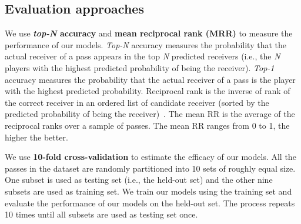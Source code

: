 \subsection{Evaluation approaches}

We use \textbf{\textit{top-N} accuracy} and \textbf{mean reciprocal rank (MRR)} to measure the performance of our models.
\textit{Top-N} accuracy measures the probability that the actual receiver of a pass appears in the top \textit{N} predicted receivers (i.e., the \textit{N} players with the highest predicted probability of being the receiver).
\textit{Top-1} accuracy measures the probability that the actual receiver of a pass is the player with the highest predicted probability.
Reciprocal rank is the inverse of rank of the correct receiver in an ordered list of candidate receiver (sorted by the predicted probability of being the receiver)~\cite{Craswell2009}.
The mean RR is the average of the reciprocal ranks over a sample of passes. The mean RR ranges from 0 to 1, the higher the better.
 
We use \textbf{10-fold cross-validation} to estimate the efficacy of our models. All the passes in the dataset are randomly partitioned into 10 sets of roughly equal size. One subset is used as testing set (i.e., the held-out set) and the other nine subsets are used as training set. 
We train our models using the training set and evaluate the performance of our models on the held-out set.
The process repeats 10 times until all subsets are used as testing set once.
